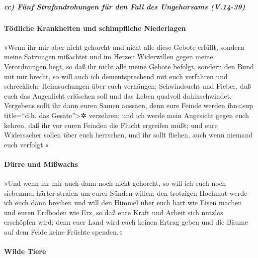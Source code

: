 \hypertarget{cc-fuxfcnf-strafandrohungen-fuxfcr-den-fall-des-ungehorsams-v.14-39}{%
\subparagraph{cc) Fünf Strafandrohungen für den Fall des Ungehorsams
(V.14-39)}\label{cc-fuxfcnf-strafandrohungen-fuxfcr-den-fall-des-ungehorsams-v.14-39}}

\hypertarget{tuxf6dliche-krankheiten-und-schimpfliche-niederlagen}{%
\paragraph{Tödliche Krankheiten und schimpfliche
Niederlagen}\label{tuxf6dliche-krankheiten-und-schimpfliche-niederlagen}}

»Wenn ihr mir aber nicht gehorcht und nicht alle diese
Gebote erfüllt, sondern meine Satzungen mißachtet und im
Herzen Widerwillen gegen meine Verordnungen hegt, so daß ihr nicht alle
meine Gebote befolgt, sondern den Bund mit mir brecht, so
will auch ich dementsprechend mit euch verfahren und schreckliche
Heimsuchungen über euch verhängen: Schwindsucht und Fieber, daß euch das
Augenlicht erlöschen soll und das Leben qualvoll dahinschwindet.
Vergebens sollt ihr dann euren Samen aussäen, denn eure Feinde werden
ihn\textless sup title=``d.h. das Gesäte''\textgreater✲ verzehren;
und ich werde mein Angesicht gegen euch kehren, daß ihr
vor euren Feinden die Flucht ergreifen müßt; und eure Widersacher sollen
über euch herrschen, und ihr sollt fliehen, auch wenn niemand euch
verfolgt.«

\hypertarget{duxfcrre-und-miuxdfwachs}{%
\paragraph{Dürre und Mißwachs}\label{duxfcrre-und-miuxdfwachs}}

»Und wenn ihr mir auch dann noch nicht gehorcht, so will
ich euch noch siebenmal härter strafen um eurer Sünden willen;
den trotzigen Hochmut werde ich euch dann brechen und
will den Himmel über euch hart wie Eisen machen und euren Erdboden wie
Erz, so daß eure Kraft und Arbeit sich nutzlos erschöpfen
wird; denn euer Land wird euch keinen Ertrag geben und die Bäume auf dem
Felde keine Früchte spenden.«

\hypertarget{wilde-tiere}{%
\paragraph{Wilde Tiere}\label{wilde-tiere}}

